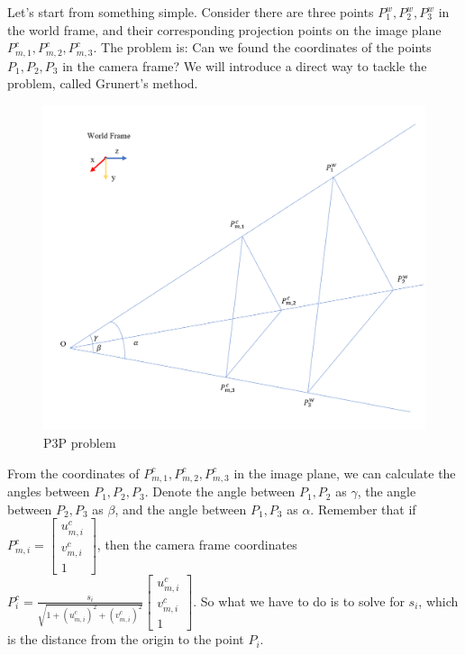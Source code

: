 \documentclass[
]{book}
\theoremstyle{definition}
\theoremstyle{definition}
\theoremstyle{definition}
\theoremstyle{definition}
\theoremstyle{remark}
\begin{document}
Let's start from something simple. Consider there are three points \(P_1^w,P_2^w,P_3^w\) in the world frame, and their corresponding projection points on the image plane \(P^c_{m,1},P^c_{m,2},P^c_{m,3}\). The problem is: Can we found the coordinates of the points \(P_1,P_2,P_3\) in the camera frame? We will introduce a direct way to tackle the problem, called Grunert's method.

\begin{figure}

{\centering \includegraphics[width=1\linewidth]{images/P3P} 

}

\caption{P3P problem}\label{fig:p3p}
\end{figure}

From the coordinates of \(P^c_{m,1},P^c_{m,2},P^c_{m,3}\) in the image plane, we can calculate the angles between \(P_1,P_2,P_3\). Denote the angle between \(P_1,P_2\) as \(\gamma\), the angle between \(P_2,P_3\) as \(\beta\), and the angle between \(P_1,P_3\) as \(\alpha\). Remember that if \(P^c_{m,i} = \begin{bmatrix}u_{m,i}^c\\v^c_{m,i}\\1\end{bmatrix}\), then the camera frame coordinates \(P^c_i = \frac{s_i}{\sqrt{1+(u_{m,i}^c)^2+(v_{m,i}^c)^2}}\begin{bmatrix}u_{m,i}^c\\v_{m,i}^c\\1\end{bmatrix}\). So what we have to do is to solve for \(s_i\), which is the distance from the origin to the point \(P_i\).
\end{document}
